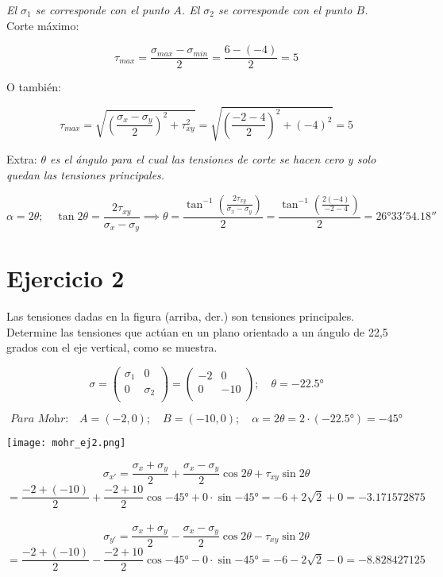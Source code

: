 \documentclass[a4paper,12pt,twoside,final,spanish]{article}
\begin{document}
\textit{El $\sigma_{1}$ se corresponde con el punto $A$. El $\sigma_{2}$ se corresponde con el punto $B$.}\\

Corte máximo:

\[
\tau_{max}=\frac{\sigma_{max}-\sigma_{min}}{2}=\frac{6-(-4)}{2}=5
\]

O también:

\[
\tau_{max}=\sqrt{\left(\frac{\sigma_{x}-\sigma_{y}}{2}\right)^{2}+\tau_{xy}^{2}}
=\sqrt{\left(\frac{-2-4}{2}\right)^{2}+(-4)^{2}}=5
\]

Extra: \textit{$\theta$ es el ángulo para el cual las tensiones de corte se hacen cero y solo quedan las tensiones principales.}

\[
\alpha=2\theta;\quad
\tan{2\theta}=\frac{2\tau_{xy}}{\sigma_{x}-\sigma_{y}}
\implies
\theta=\frac{\tan^{-1}\left(\frac{2\tau_{xy}}{\sigma_{x}-\sigma_{y}}\right)}{2}
=\frac{\tan^{-1}\left(\frac{2(-4)}{-2-4}\right)}{2}=\ang{26;33;54.18}
\]

\section*{Ejercicio 2}

Las tensiones dadas en la figura (arriba, der.) son tensiones principales. Determine las tensiones que actúan en un plano orientado a un ángulo de 22,5 grados con el eje 
vertical, como se muestra.

\dotfill  

\[
\sigma=
\left(\begin{matrix}
\sigma_{1} & 0 \\
0 & \sigma_{2} \\
\end{matrix}\right)=
\left(\begin{matrix}
-2 & 0 \\
0 & -10 \\
\end{matrix}\right);\quad\theta=-\ang{22.5}
\]

\[
\textit{Para Mohr:}\quad A=(-2,0);\quad B=(-10,0);\quad\alpha
=2\theta=2\cdot (-\ang{22.5})=-\ang{45}
\]

\begin{center}
\texttt{[image: mohr\_ej2.png]}
\end{center}

\[
\sigma_{x'}=\frac{\sigma_{x}+\sigma_{y}}{2}+\frac{\sigma_{x}-\sigma_{y}}{2}\cos{2\theta}+\tau_{xy}\sin{2\theta}
\]
\[
=\frac{-2+(-10)}{2}+\frac{-2+10}{2}\cos{\ang{-45}}+0\cdot\sin{\ang{-45}}
=-6+2\sqrt{2}+0=-3.171572875
\]
\\
\[
\sigma_{y'}=\frac{\sigma_{x}+\sigma_{y}}{2}-\frac{\sigma_{x}-\sigma_{y}}{2}\cos{2\theta}-\tau_{xy}\sin{2\theta}
\]
\[
=\frac{-2+(-10)}{2}-\frac{-2+10}{2}\cos{\ang{-45}}-0\cdot\sin{\ang{-45}}
=-6-2\sqrt{2}-0=-8.828427125
\]
\end{document}
